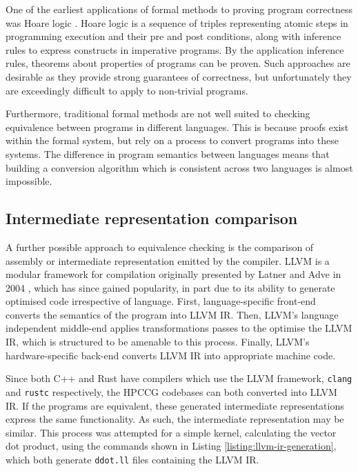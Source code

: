 One of the earliest applications of formal methods to proving program correctness was Hoare logic \cite{hoareAxiomaticBasisComputer1969}. Hoare logic is a sequence of triples representing atomic steps in programming execution and their pre and post conditions, along with inference rules to express constructs in imperative programs. By the application inference rules, theorems about properties of programs can be proven. Such approaches are desirable as they provide strong guarantees of correctness, but unfortunately they are exceedingly difficult to apply to non-trivial programs.

Furthermore, traditional formal methods are not well suited to checking equivalence between programs in different languages. This is because proofs exist within the formal system, but rely on a process to convert programs into these systems. The difference in program semantics between languages means that building a conversion algorithm which is consistent across two languages is almost impossible.

\subsection{Intermediate representation comparison}
\label{ssec:equivalence-ir-comparison}

A further possible approach to equivalence checking is the comparison of assembly or intermediate representation emitted by the compiler. LLVM is a modular framework for compilation originally presented by Latner and Adve in 2004 \cite{lattner2004llvm}, which has since gained popularity, in part due to its ability to generate optimised code irrespective of language. First, language-specific front-end converts the semantics of the program into LLVM IR. Then, LLVM's language independent middle-end applies transformations passes to the optimise the LLVM IR, which is structured to be amenable to this process. Finally, LLVM's hardware-specific back-end converts LLVM IR into appropriate machine code.

Since both C++ and Rust have compilers which use the LLVM framework, \texttt{clang} and \texttt{rustc} respectively, the HPCCG codebases can both converted into LLVM IR. If the programs are equivalent, these generated intermediate representations express the same functionality. As such, the intermediate representation may be similar. This process was attempted for a simple kernel, calculating the vector dot product, using the commands shown in Listing \ref{listing:llvm-ir-generation}, which both generate \texttt{ddot.ll} files containing the LLVM IR.

